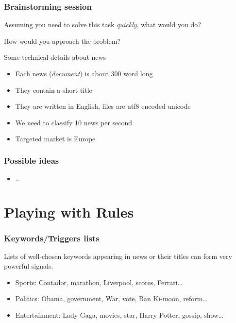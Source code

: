 \documentclass[usenames,dvipsnames]{beamer}
\newcommand{\voc}[1]{\emph{\color{ForestGreen}#1}}
\begin{document}
\begin{frame}\frametitle{Brainstorming session}
Assuming you need to solve this task \emph{quickly}, what would you do?

How would you approach the problem?
\vspace{0.8cm}

\pause
\begin{block}{Some technical details about news}
\begin{itemize}
  \item Each news (\voc{document}) is about 300 word long
  \item They contain a short title
  \item They are written in English, files are utf8 encoded unicode
  \item We need to classify 10 news per second
  \item Targeted market is Europe
\end{itemize}
\end{block}

\end{frame}

\begin{frame}\frametitle{Possible ideas}
\begin{itemize}
  \item \ldots
\end{itemize}
\end{frame}


\section{Playing with Rules}
\begin{frame}\frametitle{Keywords/Triggers lists}
Lists of well-chosen keywords appearing in news or their titles can form very powerful signals.
\vspace{0.4cm}

\begin{itemize}
  \item Sports: Contador, marathon, Liverpool, scores, Ferrari\ldots
  \item Politics: Obama, government, War, vote, Ban Ki-moon, reform\dots
  \item Entertainment: Lady Gaga, movies, star, Harry Potter, gossip, show\dots
\end{itemize}
\end{frame}
\end{document}
